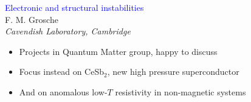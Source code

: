 \begin{emptyframe}
\begin{center}
\textcolor{Blue}{Electronic and structural instabilities} \\
\vspace{0.5em}
{\footnotesize F. M. Grosche} \\
{\footnotesize \em Cavendish Laboratory, Cambridge} \\
\vspace{0.1em}
\end{center}
\vspace{0.0em}

\begin{itemize}
    \item<1-> Projects in Quantum Matter group, happy to discuss
    \item<2-> Focus instead on CeSb$_2$, new high pressure superconductor
    \item<3-> And on anomalous low-$T$ resistivity in non-magnetic systems
\end{itemize}
\end{emptyframe}

